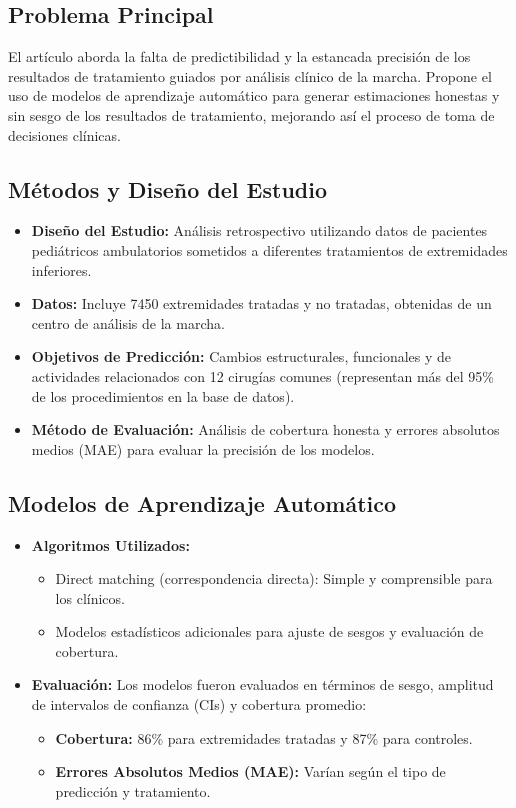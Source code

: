 \documentclass{report}
\begin{document}
\subsection{Problema Principal}
El artículo aborda la falta de predictibilidad y la estancada precisión de los resultados de tratamiento guiados por análisis clínico de la marcha. Propone el uso de modelos de aprendizaje automático para generar estimaciones honestas y sin sesgo de los resultados de tratamiento, mejorando así el proceso de toma de decisiones clínicas.

\subsection{Métodos y Diseño del Estudio}
\begin{itemize}
    \item \textbf{Diseño del Estudio:} Análisis retrospectivo utilizando datos de pacientes pediátricos ambulatorios sometidos a diferentes tratamientos de extremidades inferiores.
    \item \textbf{Datos:} Incluye 7450 extremidades tratadas y no tratadas, obtenidas de un centro de análisis de la marcha.
    \item \textbf{Objetivos de Predicción:} Cambios estructurales, funcionales y de actividades relacionados con 12 cirugías comunes (representan más del 95\% de los procedimientos en la base de datos).
    \item \textbf{Método de Evaluación:} Análisis de cobertura honesta y errores absolutos medios (MAE) para evaluar la precisión de los modelos.
\end{itemize}

\subsection{Modelos de Aprendizaje Automático}
\begin{itemize}
    \item \textbf{Algoritmos Utilizados:}
    \begin{itemize}
        \item Direct matching (correspondencia directa): Simple y comprensible para los clínicos.
        \item Modelos estadísticos adicionales para ajuste de sesgos y evaluación de cobertura.
    \end{itemize}
    \item \textbf{Evaluación:} Los modelos fueron evaluados en términos de sesgo, amplitud de intervalos de confianza (CIs) y cobertura promedio:
    \begin{itemize}
        \item \textbf{Cobertura:} 86\% para extremidades tratadas y 87\% para controles.
        \item \textbf{Errores Absolutos Medios (MAE):} Varían según el tipo de predicción y tratamiento.
    \end{itemize}
\end{itemize}
\end{document}
